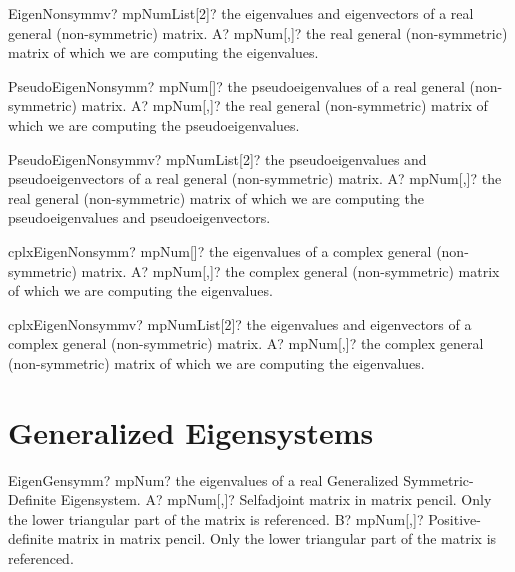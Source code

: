 \documentclass[12pt,a4paper,openany]{book}
\begin{document}
\begin{mpFunctionsExtract}
\mpFunctionOne
{EigenNonsymmv? mpNumList[2]? the eigenvalues and eigenvectors of a real general (non-symmetric) matrix.}
{A? mpNum[,]? the real general (non-symmetric) matrix of which we are computing the eigenvalues.}
\end{mpFunctionsExtract}

\begin{mpFunctionsExtract}
\mpFunctionOne
{PseudoEigenNonsymm? mpNum[]? the pseudoeigenvalues of a real general (non-symmetric) matrix.}
{A? mpNum[,]? the real general (non-symmetric) matrix of which we are computing the pseudoeigenvalues.}
\end{mpFunctionsExtract}

\begin{mpFunctionsExtract}
\mpFunctionOne
{PseudoEigenNonsymmv? mpNumList[2]? the pseudoeigenvalues and pseudoeigenvectors of a real general (non-symmetric) matrix.}
{A? mpNum[,]? the real general (non-symmetric) matrix of which we are computing the pseudoeigenvalues and pseudoeigenvectors.}
\end{mpFunctionsExtract}

\begin{mpFunctionsExtract}
\mpFunctionOne
{cplxEigenNonsymm? mpNum[]? the eigenvalues of a complex general (non-symmetric) matrix.}
{A? mpNum[,]? the complex general (non-symmetric) matrix of which we are computing the eigenvalues.}
\end{mpFunctionsExtract}

\begin{mpFunctionsExtract}
\mpFunctionOne
{cplxEigenNonsymmv? mpNumList[2]? the eigenvalues and eigenvectors of a complex general (non-symmetric) matrix.}
{A? mpNum[,]? the complex general (non-symmetric) matrix of which we are computing the eigenvalues.}
\end{mpFunctionsExtract}

\section{Generalized Eigensystems}

\begin{mpFunctionsExtract}
\mpFunctionTwo
{EigenGensymm? mpNum? the eigenvalues of a real Generalized Symmetric-Definite Eigensystem.}
{A? mpNum[,]? Selfadjoint matrix in matrix pencil. Only the lower triangular part of the matrix is referenced.}
{B? mpNum[,]? Positive-definite matrix in matrix pencil. Only the lower triangular part of the matrix is referenced.}
\end{mpFunctionsExtract}
\end{document}
